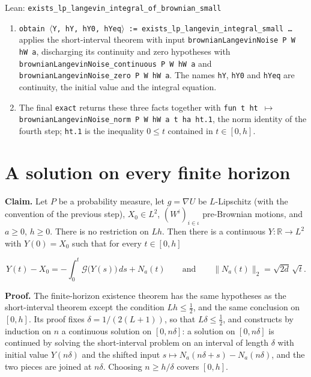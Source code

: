 \documentclass[11pt,a4paper]{article}
\begin{document}
\begin{leanbox}{Lean: \texttt{exists\_\allowbreak{}lp\_\allowbreak{}langevin\_\allowbreak{}integral\_\allowbreak{}of\_\allowbreak{}brownian\_\allowbreak{}small}}
\begin{enumerate}


\item \texttt{obtain \ensuremath{\langle}Y, h\allowbreak{}Y, h\allowbreak{}Y0, h\allowbreak{}Yeq\ensuremath{\rangle} := exists\_\allowbreak{}lp\_\allowbreak{}langevin\_\allowbreak{}integral\_\allowbreak{}small …} applies the short-interval theorem with input \texttt{brownian\allowbreak{}Langevin\allowbreak{}Noise P W h\allowbreak{}W a}, discharging its continuity and zero hypotheses with \texttt{brownian\allowbreak{}Langevin\allowbreak{}Noise\_\allowbreak{}continuous P W h\allowbreak{}W a} and \texttt{brownian\allowbreak{}Langevin\allowbreak{}Noise\_\allowbreak{}zero P W h\allowbreak{}W a}. The names \texttt{h\allowbreak{}Y}, \texttt{h\allowbreak{}Y0} and \texttt{h\allowbreak{}Yeq} are continuity, the initial value and the integral equation.

\item The final \texttt{exact} returns these three facts together with \texttt{fun t ht \ensuremath{\mapsto} brownian\allowbreak{}Langevin\allowbreak{}Noise\_\allowbreak{}norm P W h\allowbreak{}W a t ha ht.\allowbreak{}1}, the norm identity of the fourth step; \texttt{ht.\allowbreak{}1} is the inequality \(0\le t\) contained in \(t\in[0,h]\).

\end{enumerate}
\end{leanbox}

\section{\texorpdfstring{A solution on every finite horizon}{A solution on every finite horizon}}


\textbf{Claim.} Let \(P\) be a probability measure, let \(g=\nabla U\) be \(L\)-Lipschitz (with the convention of the previous step), \(X_0\in L^2\), \((W^i)_{i\in\iota}\) pre-Brownian motions, and \(a\ge0\), \(h\ge0\). There is no restriction on \(Lh\). Then there is a continuous \(Y:\mathbb R\to L^2\) with \(Y(0)=X_0\) such that for every \(t\in[0,h]\)


\[Y(t)-X_0=-\int_0^t\mathcal G\bigl(Y(s)\bigr)\,ds+N_a(t)\qquad\text{and}\qquad\|N_a(t)\|_2=\sqrt{2d}\,\sqrt t.\]


\textbf{Proof.} The finite-horizon existence theorem \cite[Section~3.14.5]{LangevinLean2026ULASC} has the same hypotheses as the short-interval theorem except the condition \(Lh\le\frac12\), and the same conclusion on \([0,h]\). Its proof fixes \(\delta=1/(2(L+1))\), so that \(L\delta\le\frac12\), and constructs by induction on \(n\) a continuous solution on \([0,n\delta]\): a solution on \([0,n\delta]\) is continued by solving the short-interval problem on an interval of length \(\delta\) with initial value \(Y(n\delta)\) and the shifted input \(s\mapsto N_a(n\delta+s)-N_a(n\delta)\), and the two pieces are joined at \(n\delta\). Choosing \(n\ge h/\delta\) covers \([0,h]\).
\end{document}
